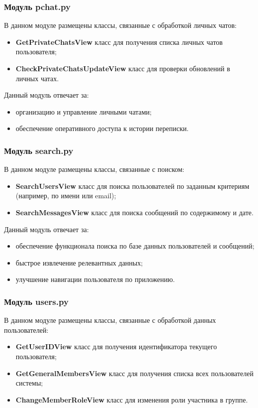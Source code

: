 \subsubsection{Модуль pchat.py}
В данном модуле размещены классы, связанные с обработкой личных чатов:
\begin{itemize}
	\item \textbf{GetPrivateChatsView} класс для получения списка личных чатов пользователя;
	\item \textbf{CheckPrivateChatsUpdateView} класс для проверки обновлений в личных чатах.
\end{itemize}

Данный модуль отвечает за:

\begin{itemize}
	\item организацию и управление личными чатами;
	\item обеспечение оперативного доступа к истории переписки.
\end{itemize}

\subsubsection{Модуль search.py}
В данном модуле размещены классы, связанные с поиском:
\begin{itemize}
	\item \textbf{SearchUsersView} класс для поиска пользователей по заданным критериям (например, по имени или email);
	\item \textbf{SearchMessagesView} класс для поиска сообщений по содержимому и дате.
\end{itemize}

Данный модуль отвечает за:
	
\begin{itemize}
	\item обеспечение функционала поиска по базе данных пользователей и сообщений;
	\item быстрое извлечение релевантных данных;
	\item улучшение навигации пользователя по приложению.
\end{itemize}

\subsubsection{Модуль users.py}
В данном модуле размещены классы, связанные с обработкой данных пользователей:
\begin{itemize}
	\item \textbf{GetUserIDView} класс для получения идентификатора текущего пользователя;
	\item \textbf{GetGeneralMembersView} класс для получения списка всех пользователей системы;
	\item \textbf{ChangeMemberRoleView} класс для изменения роли участника в группе.
\end{itemize}

